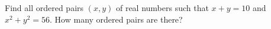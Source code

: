 Find all ordered pairs $(x,y)$ of real numbers such that $x+y=10$ and $x^2+y^2=56$. How many ordered pairs are there?
